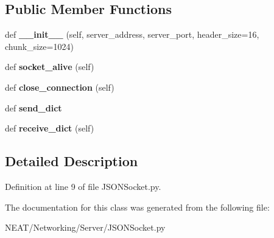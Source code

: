\subsection*{Public Member Functions}
\begin{DoxyCompactItemize}
\item 
def {\bfseries \+\_\+\+\_\+init\+\_\+\+\_\+} (self, server\+\_\+address, server\+\_\+port, header\+\_\+size=16, chunk\+\_\+size=1024)\hypertarget{class_n_e_a_t___py_genetics_1_1_n_e_a_t_1_1_networking_1_1_server_1_1_j_s_o_n_socket_1_1_j_s_o_n_socket_a95dd555e4124ce36a47d00e3b62b597a}{}\label{class_n_e_a_t___py_genetics_1_1_n_e_a_t_1_1_networking_1_1_server_1_1_j_s_o_n_socket_1_1_j_s_o_n_socket_a95dd555e4124ce36a47d00e3b62b597a}

\item 
def {\bfseries socket\+\_\+alive} (self)\hypertarget{class_n_e_a_t___py_genetics_1_1_n_e_a_t_1_1_networking_1_1_server_1_1_j_s_o_n_socket_1_1_j_s_o_n_socket_a05c99b2b4e7b4552155560f5fad0b939}{}\label{class_n_e_a_t___py_genetics_1_1_n_e_a_t_1_1_networking_1_1_server_1_1_j_s_o_n_socket_1_1_j_s_o_n_socket_a05c99b2b4e7b4552155560f5fad0b939}

\item 
def {\bfseries close\+\_\+connection} (self)\hypertarget{class_n_e_a_t___py_genetics_1_1_n_e_a_t_1_1_networking_1_1_server_1_1_j_s_o_n_socket_1_1_j_s_o_n_socket_a196c88e61cbc698f1012a5561f85f6d0}{}\label{class_n_e_a_t___py_genetics_1_1_n_e_a_t_1_1_networking_1_1_server_1_1_j_s_o_n_socket_1_1_j_s_o_n_socket_a196c88e61cbc698f1012a5561f85f6d0}

\item 
def {\bfseries send\+\_\+dict}\hypertarget{class_n_e_a_t___py_genetics_1_1_n_e_a_t_1_1_networking_1_1_server_1_1_j_s_o_n_socket_1_1_j_s_o_n_socket_a104209f938a7b47d91692face1dc0569}{}\label{class_n_e_a_t___py_genetics_1_1_n_e_a_t_1_1_networking_1_1_server_1_1_j_s_o_n_socket_1_1_j_s_o_n_socket_a104209f938a7b47d91692face1dc0569}

\item 
def {\bfseries receive\+\_\+dict} (self)\hypertarget{class_n_e_a_t___py_genetics_1_1_n_e_a_t_1_1_networking_1_1_server_1_1_j_s_o_n_socket_1_1_j_s_o_n_socket_a2bc8b4e45a2e94d386c98caba0ecce14}{}\label{class_n_e_a_t___py_genetics_1_1_n_e_a_t_1_1_networking_1_1_server_1_1_j_s_o_n_socket_1_1_j_s_o_n_socket_a2bc8b4e45a2e94d386c98caba0ecce14}

\end{DoxyCompactItemize}


\subsection{Detailed Description}


Definition at line 9 of file J\+S\+O\+N\+Socket.\+py.



The documentation for this class was generated from the following file\+:\begin{DoxyCompactItemize}
\item 
N\+E\+A\+T/\+Networking/\+Server/J\+S\+O\+N\+Socket.\+py\end{DoxyCompactItemize}
